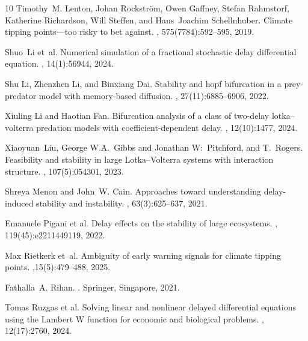 \documentclass[11pt]{article}
\begin{document}
\begin{thebibliography}{10}
	Timothy~M. Lenton, Johan Rockstr{\"o}m, Owen Gaffney, Stefan Rahmstorf,
	Katherine Richardson, Will Steffen, and Hans~Joachim Schellnhuber.
	\newblock Climate tipping points---too risky to bet against.
	, 575(7784):592--595, 2019.
	
	Shuo~Li et~al.
	\newblock Numerical simulation of a fractional stochastic delay differential
	equation.
	, 14(1):56944, 2024.
	
	Shu Li, Zhenzhen Li, and Binxiang Dai.
	\newblock Stability and hopf bifurcation in a prey-predator model with
	memory-based diffusion.
	,
	27(11):6885--6906, 2022.
	
	Xiuling Li and Haotian Fan.
	\newblock Bifurcation analysis of a class of two-delay lotka--volterra
	predation models with coefficient-dependent delay.
	, 12(10):1477, 2024.
	
	Xiaoyuan~Liu, George W.A.~Gibbs and  Jonathan W:~Pitchford, and T.~Rogers.
	\newblock Feasibility and stability in large Lotka--Volterra systems with
	interaction structure.
	, 107(5):054301, 2023.
	
	Shreya Menon and John~W. Cain.
	\newblock Approaches toward understanding delay-induced stability and
	instability.
	, 63(3):625--637, 2021.
	
	Emanuele Pigani et al.
	\newblock Delay effects on the stability of large ecosystems.
	,
	119(45):e2211449119, 2022.
	
	
	Max Rietkerk et~al.
	\newblock Ambiguity of early warning signals for climate tipping points.
	,15(5):479--488, 2025.
	
	Fathalla~A. Rihan.
	.
	\newblock Springer, Singapore, 2021.
	
	Tomas Ruzgas et al.
	\newblock Solving linear and nonlinear delayed differential equations using the
	Lambert W function for economic and biological problems.
	, 12(17):2760, 2024.
	

\end{thebibliography}
\end{document}
